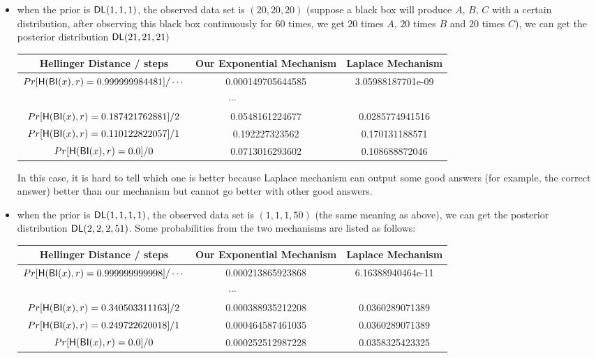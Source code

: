 \begin{itemize}
\begin{itemize}
		\item when the prior is $\mathsf{DL}(1,1,1)$, the observed data set is $(20,20,20)$ (suppose a black box will produce $A$, $B$, $C$ with a certain distribution, after observing this black box continuously for 60 times, we get $20$ times $A$, $20$ times $B$ and $20$ times $C$), we can get the posterior distribution $\mathsf{DL}(21,21,21)$

		\begin{center}
		 \begin{tabular}{c | c | c} 
		 \hline
		 Hellinger Distance / steps & Our Exponential Mechanism & Laplace Mechanism  \\
		 \hline\hline
		 $Pr[\mathsf{H}(\mathsf{BI}(x), r) = 0.999999984481] / \cdots 	$ & 0.000149705644585 & 3.05988187701e-09\\ 
		 \hline
		 \multicolumn{3}{c}{$\cdots$}  \\
		 \hline
		 $Pr[\mathsf{H}(\mathsf{BI}(x), r) = 0.187421762881] / 2		$ & 0.0548161224677 & 0.0285774941516 \\
		 \hline
		 $Pr[\mathsf{H}(\mathsf{BI}(x), r) = 0.110122822057 ] / 1		$ & 0.192227323562 & 0.170131188571  \\
		 \hline
		 $Pr[\mathsf{H}(\mathsf{BI}(x), r) = 0.0 ] / 0 					$ & 0.0713016293602 & 0.108688872046 \\
		 \hline
		\end{tabular}
		\end{center}

		In this case, it is hard to tell which one is better because Laplace mechanism can output some good answers (for example, the correct answer) better than our mechanism but cannot go better with other good answers.

		\item when the prior is $\mathsf{DL}(1,1,1,1)$, the observed data set is $(1,1,1,50)$ (the same meaning as above), we can get the posterior distribution $\mathsf{DL}(2,2,2,51)$. Some probabilities from the two mechanisms are listed as follows:
		\begin{center}
		 \begin{tabular}{c | c | c} 
		 \hline
		 Hellinger Distance / steps & Our Exponential Mechanism & Laplace Mechanism  \\
		 \hline\hline
		 $Pr[\mathsf{H}(\mathsf{BI}(x), r) = 0.999999999998] / \cdots 	$ & 0.000213865923868 & 6.16388940464e-11\\ 
		 \hline
		 \multicolumn{3}{c}{$\cdots$}  \\
		 \hline
		 $Pr[\mathsf{H}(\mathsf{BI}(x), r) = 0.340503311163] / 2		$ & 0.000388935212208 & 0.0360289071389 \\
		 \hline
		 $Pr[\mathsf{H}(\mathsf{BI}(x), r) = 0.249722620018 ] / 1		$ & 0.000464587461035 & 0.0360289071389  \\
		 \hline
		 $Pr[\mathsf{H}(\mathsf{BI}(x), r) = 0.0 ] / 0 					$ & 0.000252512987228 & 0.0358325423325 \\
		 \hline
		\end{tabular}
		\end{center}


\end{itemize}
\end{itemize}
